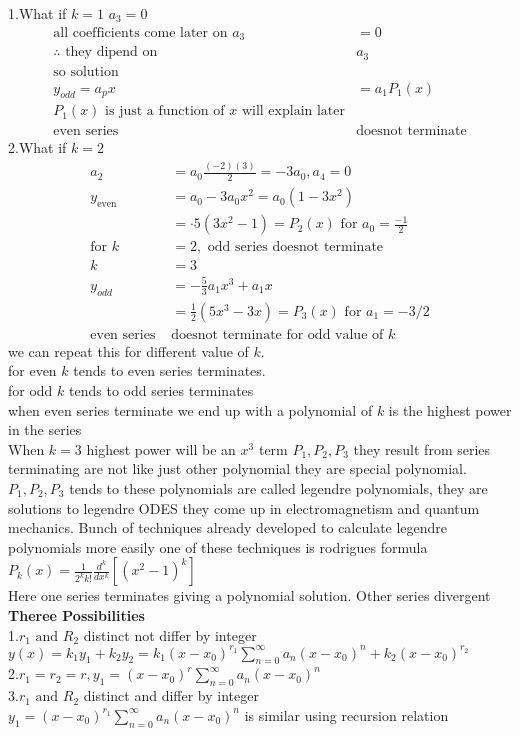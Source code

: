 1.\quad What if $k=1$ \quad $a_3=0$
\begin{align*}
\text{all coefficients come later on }a_3&=0\\
\therefore \text{ they dipend on }&a_3\\
\text{so solution}\\
y_{odd}=a_px&=a_1P_1(x)\\
P_1(x)\text{ is just a function of $x$ will explain later}\\
\text{even series }&\text{doesnot terminate}
\end{align*}
2.\quad What if $k=2$
\begin{align*}
a_2&=a_{0} \frac{(-2)(3)}{2}=-3 a_{0}, a_{4}=0\\
y_{\text {even }}&=a_{0}-3 a_{0} x^{2}=a_{0}\left(1-3 x^{2}\right)\\
&=\cdot 5\left(3 x^{2}-1\right)=P_{2}(x) \text{ for }a_0=\frac{-1}{2}\\
\text{for }k&=2,\text{ odd series doesnot terminate}\\
k&=3\\
y_ {odd} &=-\frac{5}{3} a_1 x^{3}+a_{1} x\\
&=\frac{1}{2}\left(5 x^{3}-3 x\right)=P_{3}(x)\text{ for }a_{1}=-3 / 2\\
\text{even series }&\text{doesnot terminate for odd value of $k$}
\end{align*}
we can repeat this for different value of $k$. \\for even $k$ tends to even series terminates.\\
for odd $k$ tends to odd series terminates\\
when even series terminate we end up with a polynomial of $k$ is the highest power in the series \\
When $k=3$  highest power will be an $x^3$ term $P_1, P_2, P_3$ they result from series terminating are not like just other polynomial they are special polynomial.\\
$P_1, P_2, P_3$ tends to these polynomials are called legendre polynomials, they are solutions to legendre ODES they come up in electromagnetism and quantum mechanics. Bunch of techniques already developed to calculate legendre polynomials more easily one of these techniques is rodrigues formula
$P_{k}(x)=\frac{1}{2^{k} k !} \frac{d^{k}}{d x^{k}}\left[\left(x^{2}-1\right)^{k}\right]$\\
Here one series terminates giving a polynomial solution. Other series divergent\\
\textbf{Theree Possibilities}\\
1.\quad $r_1\text{ and }R_2$ distinct not differ by integer\\
$y(x)=k_1y_1+k_2y_2=k_1(x-x_0)^{r_1}\sum\limits_{n=0}^{\infty}a_n(x-x_0)^n+k_2(x-x_0)^{r_2}$\\
2.\quad $r_1=r_2=r,y_1=(x-x_0)^r\sum_{n=0}^{\infty} a_{n}\left(x-x_{0}\right)^{n}$\\
3.\quad $r_1\text{ and }R_2$ distinct and differ by integer\\
$y_1=(x-x_0)^{r_1}\sum_{n=0}^{\infty} a_{n}\left(x-x_{0}\right)^{n}$ is similar using recursion relation \\
